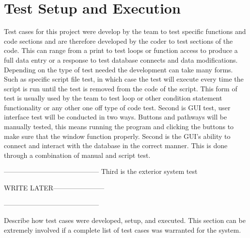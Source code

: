 \section{Test Setup and Execution}
Test cases for this project were develop by the team to test specific functions and code sections and are therefore developed by the coder to test sections of the code. This can range from a print to test loops or function access to produce a full data entry or a response to test database connects and data modifications.
Depending on the type of test needed the development can take many forms. Such as specific script file test, in which case the test will execute every time the script is run until the test is removed from the code of the script. This form of test is usually used by the team to test loop or other condition statement functionality or any other one off type of code test.
Second is GUI test, user interface test will be conducted in two ways. Buttons and pathways will be manually tested, this means running the program and clicking the buttons to make sure that the window function properly. Second is the GUI's ability to connect and interact with the database in the correct manner. This is done through a combination of manual and script test.

------------------------------------------
Third is the exterior system test

WRITE LATER-----------------------

------------------------------------------


Describe how test cases were developed, setup, and executed.  This section can 
be extremely involved if a complete list of test cases was warranted for the system. 

